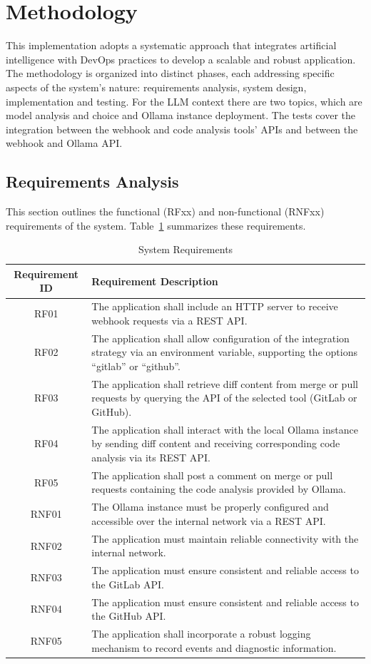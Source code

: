 \documentclass[12pt]{article}
\begin{document}
\section{Methodology}
This implementation adopts a systematic approach that integrates artificial intelligence with DevOps practices to develop a scalable and robust application. The methodology is organized into distinct phases, each addressing specific aspects of the system’s nature: requirements analysis, system design, implementation and testing. For the LLM context there are two topics, which are model analysis and choice and Ollama instance deployment. The tests cover the integration between the webhook and code analysis tools' APIs and between the webhook and Ollama API.

\subsection{Requirements Analysis}
This section outlines the functional (RFxx) and non-functional (RNFxx) requirements of the system. Table~\ref{tab:requirements} summarizes these requirements.

\begin{table}[h!]
\centering
\begin{tabular}{|c|p{10cm}|}
\hline
\textbf{Requirement ID} & \textbf{Requirement Description} \\ \hline
RF01 & The application shall include an HTTP server to receive webhook requests via a REST API. \\ \hline
RF02 & The application shall allow configuration of the integration strategy via an environment variable, supporting the options “gitlab” or “github”. \\ \hline
RF03 & The application shall retrieve diff content from merge or pull requests by querying the API of the selected tool (GitLab or GitHub). \\ \hline
RF04 & The application shall interact with the local Ollama instance by sending diff content and receiving corresponding code analysis via its REST API. \\ \hline
RF05 & The application shall post a comment on merge or pull requests containing the code analysis provided by Ollama. \\ \hline
RNF01 & The Ollama instance must be properly configured and accessible over the internal network via a REST API. \\ \hline
RNF02 & The application must maintain reliable connectivity with the internal network. \\ \hline
RNF03 & The application must ensure consistent and reliable access to the GitLab API. \\ \hline
RNF04 & The application must ensure consistent and reliable access to the GitHub API. \\ \hline
RNF05 & The application shall incorporate a robust logging mechanism to record events and diagnostic information. \\ \hline
\end{tabular}
\caption{System Requirements}
\label{tab:requirements}
\end{table}
\end{document}
